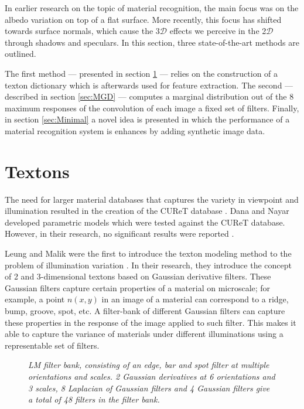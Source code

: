 \hypertarget{RelatedWork}{
}
In earlier research on the topic of material recognition, the main focus was on the albedo variation on top of a flat surface. More recently, this focus has shifted towards surface normals, which cause the 3$\mathcal{D}$ effects we perceive in the 2$\mathcal{D}$ through shadows and speculars. In this section, three state-of-the-art methods are outlined.

The first method --- presented in section \ref{sec:Textons} --- relies on the construction of a texton dictionary which is afterwards used for feature extraction. The second --- described in section \ref{sec:MGD} --- computes a marginal distribution out of the 8 maximum responses of the convolution of each image a fixed set of filters. Finally, in section \ref{sec:Minimal} a novel idea is presented in which the performance of a material recognition system is enhances by adding synthetic image data.


\section{Textons}\label{sec:Textons}

The need for larger material databases that captures the variety in viewpoint and illumination resulted in the creation of the CUReT database \cite{DanaNayar}. Dana and Nayar developed parametric models  which were tested against the CUReT database. However, in their research, no significant results were reported \cite{VarmaZisserman}.

Leung and Malik were the first to introduce the texton modeling method to the problem of illumination variation \cite{LeungMalik}. In their research, they introduce the concept of 2 and 3-dimensional textons based on Gaussian derivative filters. These Gaussian filters capture certain properties of a material on microscale; for example, a point $n(x,y)$ in an image of a material can correspond to a ridge, bump, groove, spot, etc. A filter-bank of different Gaussian filters can capture these properties in the response of the image applied to such filter. This makes it able to capture the variance of materials under different illuminations using a representable set of filters.

\begin{figure}[b]
	\begin{center}
	\end{center}
	\caption{\textit{LM filter bank, consisting of an edge, bar and spot filter at multiple orientations and scales. 2 Gaussian derivatives at 6 orientations and 3 scales, 8 Laplacian of Gaussian filters and 4 Gaussian filters give a total of 48 filters in the filter bank.}}
	\label{fig:LM}
\end{figure}


